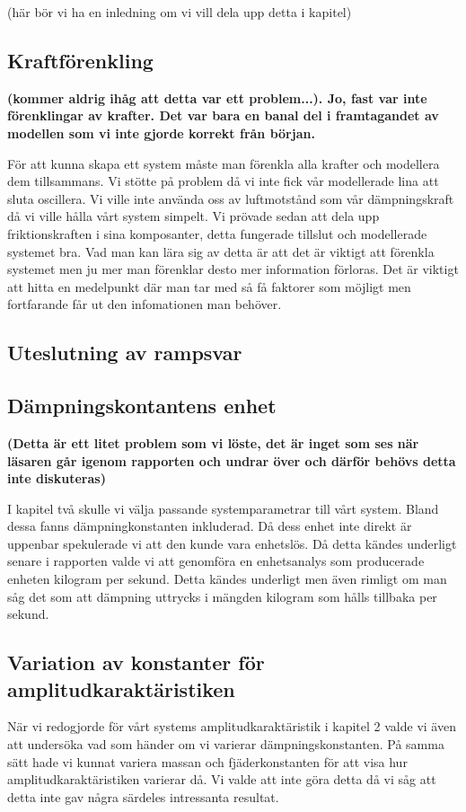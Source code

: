 (här bör vi ha en inledning om vi vill dela upp detta i kapitel)


\subsection{Kraftförenkling}
\textbf{(kommer aldrig ihåg att detta var ett problem...). Jo, fast var inte förenklingar av krafter. Det var bara en banal del i framtagandet av modellen som vi inte gjorde korrekt från början.}

För att kunna skapa ett system måste man förenkla alla krafter och modellera dem tillsammans. Vi stötte på problem då vi inte fick vår modellerade lina att sluta oscillera. Vi ville inte använda oss av luftmotstånd som vår dämpningskraft då vi ville hålla vårt system simpelt. Vi prövade sedan att dela upp friktionskraften i sina komposanter, detta fungerade tillslut och modellerade systemet bra. Vad man kan lära sig av detta är att det är viktigt att förenkla systemet men ju mer man förenklar desto mer information förloras. Det är viktigt att hitta en medelpunkt där man tar med så få faktorer som möjligt men fortfarande får ut den infomationen man behöver.

\subsection{Uteslutning av rampsvar}


\subsection{Dämpningskontantens enhet}
\textbf{(Detta är ett litet problem som vi löste, det är inget som ses när läsaren går igenom rapporten och undrar över och därför behövs detta inte diskuteras)}

I kapitel två skulle vi välja passande systemparametrar till vårt system. Bland dessa fanns dämpningkonstanten inkluderad. Då dess enhet inte direkt är uppenbar spekulerade vi att den kunde vara enhetslös. Då detta kändes underligt senare i rapporten valde vi att genomföra en enhetsanalys som producerade enheten kilogram per sekund. Detta kändes underligt men även rimligt om man såg det som att dämpning uttrycks i mängden kilogram som hålls tillbaka per sekund.

\subsection{Variation av konstanter för amplitudkaraktäristiken}
När vi redogjorde för vårt systems amplitudkaraktäristik i kapitel 2 valde vi även att undersöka vad som händer om vi varierar dämpningskonstanten. På samma sätt hade vi kunnat variera massan och fjäderkonstanten för att visa hur amplitudkaraktäristiken varierar då. Vi valde att inte göra detta då vi såg att detta inte gav några särdeles intressanta resultat.

